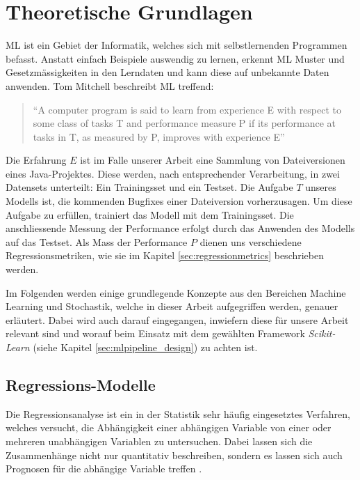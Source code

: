 \documentclass[10pt, a4paper]{article}
\begin{document}
\section{Theoretische Grundlagen}

\acf{ML} ist ein Gebiet der Informatik, welches sich mit selbstlernenden Programmen befasst. Anstatt einfach Beispiele auswendig zu lernen, erkennt \ac{ML} Muster und Gesetzmässigkeiten in den Lerndaten und kann diese auf unbekannte Daten anwenden. Tom Mitchell beschreibt \ac{ML} treffend:
\begin{quote}
	``A computer program is said to learn from experience E with respect to some class of tasks T and performance measure P if its performance at tasks in T, as measured by P, improves with experience E'' \cite{mitchell1997}
\end{quote}
Die Erfahrung \(E\) ist im Falle unserer Arbeit eine Sammlung von Dateiversionen eines Java-Projektes. Diese werden, nach entsprechender Verarbeitung, in zwei Datensets unterteilt: Ein Trainingsset und ein Testset. Die Aufgabe \(T\) unseres Modells ist, die kommenden Bugfixes einer Dateiversion vorherzusagen. Um diese Aufgabe zu erfüllen, trainiert das Modell mit dem Trainingsset. Die anschliessende Messung der Performance erfolgt durch das Anwenden des Modells auf das Testset. Als Mass der Performance \(P\) dienen uns verschiedene Regressionsmetriken, wie sie im Kapitel \ref{sec:regressionmetrics} beschrieben werden.

Im Folgenden werden einige grundlegende Konzepte aus den Bereichen Machine Learning und Stochastik, welche in dieser Arbeit aufgegriffen werden, genauer erläutert. Dabei wird auch darauf eingegangen, inwiefern diese für unsere Arbeit relevant sind und worauf beim Einsatz mit dem gewählten Framework \emph{Scikit-Learn} (siehe Kapitel \ref{sec:mlpipeline_design}) zu achten ist.

\subsection{Regressions-Modelle} \label{sec:regressionmodels}
Die Regressionsanalyse ist ein in der Statistik sehr häufig eingesetztes Verfahren, welches versucht, die Abhängigkeit einer abhängigen Variable von einer oder mehreren unabhängigen Variablen zu untersuchen. Dabei lassen sich die Zusammenhänge nicht nur quantitativ beschreiben, sondern es lassen sich auch Prognosen für die abhängige Variable treffen \cite{uzhregression}.
\end{document}
